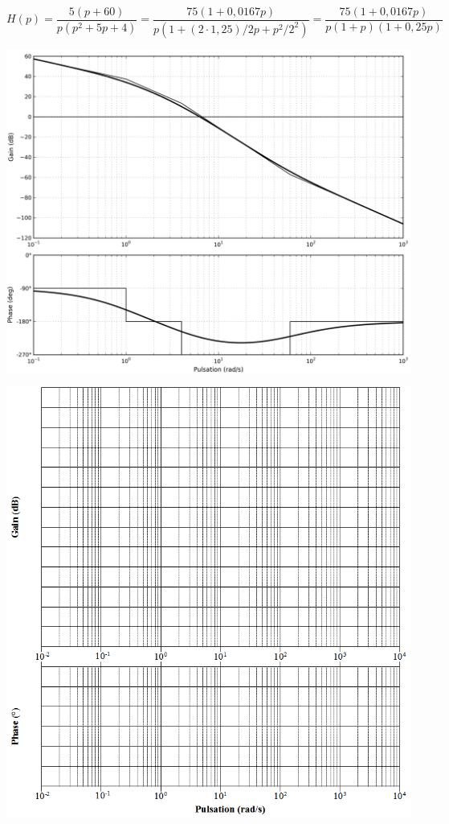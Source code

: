 \documentclass[10pt,fleqn]{article} %
\begin{document}
\begin{multicols}{2}
\begin{corrige}
$H(p)=\dfrac{5(p+60)}{p(p^2+5p+4)} =\dfrac{75(1+0,0167p)}{p(1+(2\cdot 1,25)/2 p+p^2/2^2 )} =\dfrac{75(1+0,0167p)}{p(1+p)(1+0,25p)}
$
\end{corrige}
\begin{center}
\includegraphics[width=\linewidth]{images/cor_02}
\end{center}
\else
\begin{center}
\includegraphics[width=\linewidth]{images/img_05}
\end{center}\fi




\end{multicols}
\end{document}
